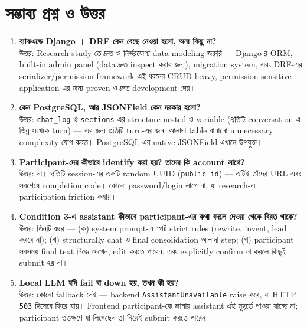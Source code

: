 \documentclass[11pt,a4paper]{article}
\newcommand{\code}[1]{\texttt{\small #1}}
\begin{document}
\newpage
\section{সম্ভাব্য প্রশ্ন ও উত্তর}

\begin{enumerate}[leftmargin=*, label=\textbf{প্রশ্ন \arabic*.}]

\item \textbf{ব্যাকএন্ডে Django + DRF কেন বেছে নেওয়া হলো, অন্য কিছু না?}\\
উত্তর: Research study-তে দ্রুত ও নির্ভরযোগ্য data-modeling জরুরি --- Django-র ORM, built-in
admin panel (data দ্রুত inspect করার জন্য), migration system, এবং DRF-এর serializer/permission
framework এই ধরনের CRUD-heavy, permission-sensitive application-এর জন্য proven ও দ্রুত
development দেয়।

\item \textbf{কেন PostgreSQL, আর JSONField কেন দরকার হলো?}\\
উত্তর: \code{chat\_log} ও \code{sections}-এর structure nested ও variable (প্রতিটি
conversation-এ ভিন্ন সংখ্যক turn) --- এর জন্য প্রতিটি turn-এর জন্য আলাদা table বানানো
unnecessary complexity যোগ করত। PostgreSQL-এর native JSONField এখানে উপযুক্ত।

\item \textbf{Participant-দের কীভাবে identify করা হয়? তাদের কি account লাগে?}\\
উত্তর: না। প্রতিটি session-এর একটি random UUID (\code{public\_id}) --- এটিই তাঁদের URL এবং
সবশেষে completion code। কোনো password/login লাগে না, যা research-এ participation friction
কমায়।

\item \textbf{Condition 3-এ assistant কীভাবে participant-এর কথা বদলে দেওয়া থেকে বিরত থাকে?}\\
উত্তর: তিনটি স্তরে --- (ক) system prompt-এ স্পষ্ট strict rules (rewrite, invent, lead করবে
না); (খ) structurally chat ও final consolidation আলাদা step; (গ) participant সবসময় final
text নিজে দেখেন, edit করতে পারেন, এবং explicitly confirm না করলে কিছুই submit হয় না।

\item \textbf{Local LLM যদি fail বা down হয়, তখন কী হয়?}\\
উত্তর: কোনো fallback নেই --- backend \code{AssistantUnavailable} raise করে, যা HTTP
\code{503} হিসেবে ফিরে যায়। Frontend participant-কে জানায় assistant এই মুহূর্তে পাওয়া
যাচ্ছে না; participant ততক্ষণে যা লিখেছেন তা নিয়েই submit করতে পারেন।


\end{enumerate}
\end{document}
